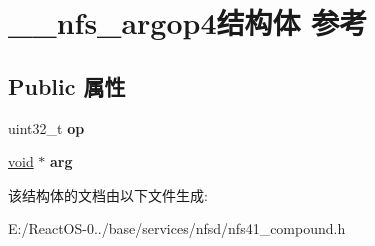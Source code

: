 \hypertarget{struct____nfs__argop4}{}\section{\+\_\+\+\_\+nfs\+\_\+argop4结构体 参考}
\label{struct____nfs__argop4}
\subsection*{Public 属性}
\begin{DoxyCompactItemize}
\item 
\mbox{\label{struct____nfs__argop4_abb4846e60be89c787debb8e027bcc6c7}} 
uint32\+\_\+t {\bfseries op}
\item 
\mbox{\label{struct____nfs__argop4_a07245cc9f57b362187b234a99bc87a6e}} 
\hyperlink{interfacevoid}{void} $\ast$ {\bfseries arg}
\end{DoxyCompactItemize}


该结构体的文档由以下文件生成\+:\begin{DoxyCompactItemize}
\item 
E\+:/\+React\+O\+S-\/0../base/services/nfsd/nfs41\+\_\+compound.\+h\end{DoxyCompactItemize}
